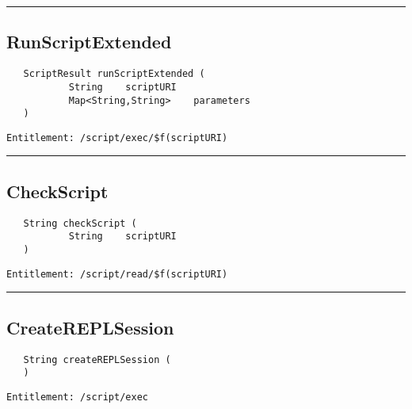 \rule{12cm}{2pt}
\subsection{RunScriptExtended}
\label{Api:RunScriptExtended}
\begin{Verbatim}
   ScriptResult runScriptExtended (
           String    scriptURI
           Map<String,String>    parameters
   )
\end{Verbatim}
\begin{Verbatim}[formatcom=\color{Maroon}]
  Entitlement: /script/exec/$f(scriptURI)
\end{Verbatim}



\rule{12cm}{2pt}
\subsection{CheckScript}
\label{Api:CheckScript}
\begin{Verbatim}
   String checkScript (
           String    scriptURI
   )
\end{Verbatim}
\begin{Verbatim}[formatcom=\color{Maroon}]
  Entitlement: /script/read/$f(scriptURI)
\end{Verbatim}



\rule{12cm}{2pt}
\subsection{CreateREPLSession}
\label{Api:CreateREPLSession}
\begin{Verbatim}
   String createREPLSession (
   )
\end{Verbatim}
\begin{Verbatim}[formatcom=\color{Maroon}]
  Entitlement: /script/exec
\end{Verbatim}



